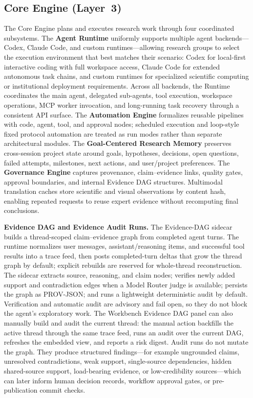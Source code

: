 \documentclass[sn-basic,Numbered,pdflatex]{sn-jnl}
\begin{document}
\subsection{Core Engine (Layer~3)}
The Core Engine plans and executes research work through four coordinated subsystems. The \textbf{Agent Runtime} uniformly supports multiple agent backends---Codex, Claude Code, and custom runtimes---allowing research groups to select the execution environment that best matches their scenario: Codex for local-first interactive coding with full workspace access, Claude Code for extended autonomous task chains, and custom runtimes for specialized scientific computing or institutional deployment requirements. Across all backends, the Runtime coordinates the main agent, delegated sub-agents, tool execution, workspace operations, MCP worker invocation, and long-running task recovery through a consistent API surface. The \textbf{Automation Engine} formalizes reusable pipelines with code, agent, tool, and approval nodes; scheduled execution and loop-style fixed protocol automation are treated as run modes rather than separate architectural modules. The \textbf{Goal-Centered Research Memory} preserves cross-session project state around goals, hypotheses, decisions, open questions, failed attempts, milestones, next actions, and user/project preferences. The \textbf{Governance Engine} captures provenance, claim--evidence links, quality gates, approval boundaries, and internal Evidence DAG structures. Multimodal translation caches store scientific and visual observations by content hash, enabling repeated requests to reuse expert evidence without recomputing final conclusions.

\textbf{Evidence DAG and Evidence Audit Runs.} The Evidence-DAG sidecar builds a thread-scoped claim--evidence graph from completed agent turns. The runtime normalizes user messages, assistant/reasoning items, and successful tool results into a trace feed, then posts completed-turn deltas that grow the thread graph by default; explicit rebuilds are reserved for whole-thread reconstruction. The sidecar extracts source, reasoning, and claim nodes; verifies newly added support and contradiction edges when a Model Router judge is available; persists the graph as PROV-JSON; and runs a lightweight deterministic audit by default. Verification and automatic audit are advisory and fail open, so they do not block the agent's exploratory work. The Workbench Evidence DAG panel can also manually build and audit the current thread: the manual action backfills the active thread through the same trace feed, runs an audit over the current DAG, refreshes the embedded view, and reports a risk digest. Audit runs do not mutate the graph. They produce structured findings---for example ungrounded claims, unresolved contradictions, weak support, single-source dependencies, hidden shared-source support, load-bearing evidence, or low-credibility sources---which can later inform human decision records, workflow approval gates, or pre-publication commit checks.
\end{document}
